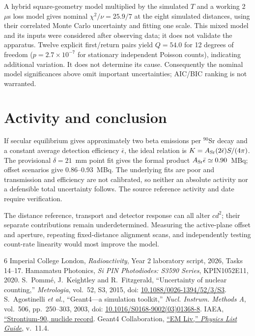 \documentclass[journal,a4paper]{Imperial_lab_report}
\begin{document}
A hybrid square-geometry model multiplied by the simulated $T$ and a working 2~$\mu$s loss model gives nominal $\chi^2/\nu=25.9/7$ at the eight simulated distances, using their correlated Monte Carlo uncertainty and fitting one scale. This mixed model and its inputs were considered after observing data; it does not validate the apparatus. Twelve explicit first/return pairs yield $Q=54.0$ for 12 degrees of freedom ($p=2.7\times10^{-7}$ for stationary independent Poisson counts), indicating additional variation. It does not determine its cause. Consequently the nominal model significances above omit important uncertainties; AIC/BIC ranking is not warranted.

\section{Activity and conclusion}
If secular equilibrium gives approximately two beta emissions per $^{90}$Sr decay and a constant average detection efficiency $\bar\epsilon$, the ideal relation is $K=A_{\rm Sr}(2\bar\epsilon)S/(4\pi)$. The provisional $\delta=21$~mm point fit gives the formal product $A_{\rm Sr}\bar\epsilon\simeq0.90$~MBq; offset scenarios give 0.86--0.93~MBq. The underlying fits are poor and transmission and efficiency are not calibrated, so neither an absolute activity nor a defensible total uncertainty follows. The source reference activity and date require verification.

The distance reference, transport and detector response can all alter $cd^2$; their separate contributions remain underdetermined. Measuring the active-plane offset and aperture, repeating fixed-distance alignment scans, and independently testing count-rate linearity would most improve the model.
\begin{thebibliography}{6}
 Imperial College London, \emph{Radioactivity}, Year 2 laboratory script, 2026, Tasks 14--17.
 Hamamatsu Photonics, \emph{Si PIN Photodiodes: S3590 Series}, KPIN1052E11, 2020.
 S.~Pomm\'e, J.~Keightley and R.~Fitzgerald, ``Uncertainty of nuclear counting,'' \emph{Metrologia}, vol.~52, S3, 2015, doi: \href{https://doi.org/10.1088/0026-1394/52/3/S3}{10.1088/0026-1394/52/3/S3}.
 S.~Agostinelli \emph{et al.}, ``Geant4---a simulation toolkit,'' \emph{Nucl. Instrum. Methods A}, vol.~506, pp.~250--303, 2003, doi: \href{https://doi.org/10.1016/S0168-9002(03)01368-8}{10.1016/S0168-9002(03)01368-8}.
 IAEA, \href{https://nucleus.iaea.org/sites/fcris/SitePages/Pestiside-Attributes/STRON.htm}{``Strontium-90, nuclide record}.
 Geant4 Collaboration, \href{https://geant4.web.cern.ch/documentation/dev/plg_html/PhysicsListGuide/electromagnetic/Liv.html}{``EM Liv,'' \emph{Physics List Guide}}, v.~11.4.
\end{thebibliography}
\end{document}
